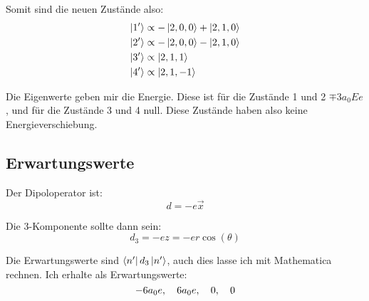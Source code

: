 Somit sind die neuen Zustände also:
\begin{align*}
	\ket{1'} &\propto - \ket{2, 0, 0} + \ket{2, 1, 0} \\
	\ket{2'} &\propto - \ket{2, 0, 0} - \ket{2, 1, 0} \\
	\ket{3'} &\propto \ket{2, 1, 1} \\
	\ket{4'} &\propto \ket{2, 1, -1}
\end{align*}

Die Eigenwerte geben mir die Energie. Diese ist für die Zustände 1 und 2 $\mp 3
a_0 E e$, und für die Zustände 3 und 4 null. Diese Zustände haben also keine
Energieverschiebung.

\subsection{Erwartungswerte}

Der Dipoloperator ist:
\[
	d = - e \vec x
\]

Die 3-Komponente sollte dann sein:
\[
	d_3 = - ez
	= - er \cos(\theta)
\]

Die Erwartungswerte sind $\bra{n'} d_3 \ket{n'}$, auch dies lasse ich mit
Mathematica rechnen. Ich erhalte als Erwartungswerte:
\[
	- 6 a_0 e
	,\quad
	6 a_0 e
	,\quad
	0
	,\quad
	0
\]




\IfFileExists{\bibliographyfile}{
}{}



